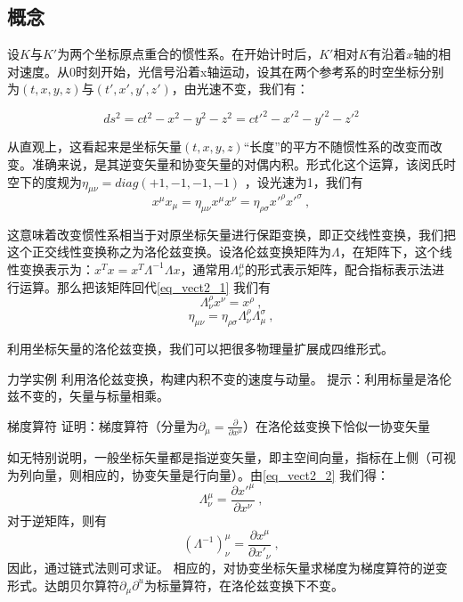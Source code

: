 \subsection{概念}
设$K$与$K'$为两个坐标原点重合的惯性系。在开始计时后，$K'$相对$K$有沿着$x$轴的相对速度。从$0$时刻开始，光信号沿着x轴运动，设其在两个参考系的时空坐标分别为$(t,x,y,z)$与$(t',x',y',z')$，由光速不变，我们有：

$$ds^2=ct^2-x^2-y^2-z^2=ct'^2-x'^2-y'^2-z'^2$$

从直观上，这看起来是坐标矢量$(t,x,y,z)$“长度”的平方不随惯性系的改变而改变。准确来说，是其逆变矢量和协变矢量的对偶内积。形式化这个运算，该闵氏时空下的度规为$\eta_{\mu\nu}=diag(+1,-1,-1,-1) $ ，设光速为1，我们有
\begin{equation}\label{eq_vect2_1}
x^\mu x_\mu =\eta_{\mu\nu}x^\mu x^\nu=\eta_{\rho \sigma}x'^\rho x'^\sigma~,   
\end{equation}

这意味着改变惯性系相当于对原坐标矢量进行保距变换，即正交线性变换，我们把这个正交线性变换称之为洛伦兹变换。设洛伦兹变换矩阵为$\Lambda$，在矩阵下，这个线性变换表示为：$x^T x=x^T\Lambda^{-1}\Lambda x$，通常用$\Lambda^\mu_\nu $的形式表示矩阵，配合指标表示法进行运算。那么把该矩阵回代\autoref{eq_vect2_1} 我们有
\begin{equation}\label{eq_vect2_2}
\Lambda^\rho_\nu x^\nu=x^\rho~,
\end{equation}
\begin{equation}
\eta_{\mu\nu}=\eta_{\rho \sigma}\Lambda^\rho_\nu \Lambda^\sigma_\mu~, 
\end{equation}

利用坐标矢量的洛伦兹变换，我们可以把很多物理量扩展成四维形式。
\begin{exercise}{力学实例}
利用洛伦兹变换，构建内积不变的速度与动量。
提示：利用标量是洛伦兹不变的，矢量与标量相乘。
\end{exercise}
\begin{exercise}{梯度算符}
证明：梯度算符（分量为$\partial_\mu=\frac{\partial}{\partial x^\mu}$）在洛伦兹变换下恰似一协变矢量

如无特别说明，一般坐标矢量都是指逆变矢量，即主空间向量，指标在上侧（可视为列向量，则相应的，协变矢量是行向量）。由\autoref{eq_vect2_2} 我们得：
\begin{equation}
\Lambda^\mu_\nu=\frac{\partial x'^\mu}{\partial x^\nu}~,
\end{equation}
对于逆矩阵，则有
\begin{equation}
(\Lambda^{-1})^\mu_\nu=\frac{\partial x^\mu }{\partial x'_\nu}~,
\end{equation}
因此，通过链式法则可求证。
相应的，对协变坐标矢量求梯度为梯度算符的逆变形式。达朗贝尔算符$\partial_\mu\partial^u$为标量算符，在洛伦兹变换下不变。
\end{exercise}

